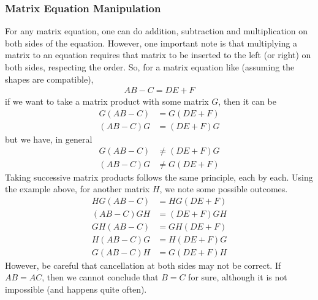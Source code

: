 \subsubsection{Matrix Equation Manipulation}
For any matrix equation, one can do addition, subtraction and multiplication on both sides of the equation. However, one important note is that multiplying a matrix to an equation requires that matrix to be inserted to the left (or right) on both sides, respecting the order. So, for a matrix equation like (assuming the shapes are compatible),
\begin{align*}
AB-C = DE+F
\end{align*}
if we want to take a matrix product with some matrix $G$, then it can be
\begin{align*}
G(AB-C) &= G(DE+F) \\
(AB-C)G &= (DE+F)G
\end{align*}
but we have, in general
\begin{align*}
G(AB-C) &\neq (DE+F)G \\
(AB-C)G &\neq G(DE+F)
\end{align*}
Taking successive matrix products follows the same principle, each by each. Using the example above, for another matrix $H$, we note some possible outcomes.
\begin{align*}
HG(AB-C) &= HG(DE+F) \\
(AB-C)GH &= (DE+F)GH \\
GH(AB-C) &= GH(DE+F) \\
H(AB-C)G &= H(DE+F)G \\
G(AB-C)H &= G(DE+F)H 
\end{align*}
However, be careful that cancellation at both sides may not be correct. If $AB = AC$, then we cannot conclude that $B = C$ for sure, although it is not impossible (and happens quite often).

